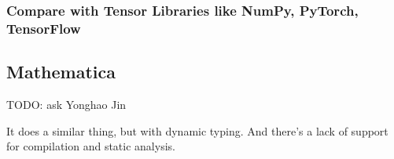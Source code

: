 \documentclass{article}
\begin{document}
\subsubsection{Compare with Tensor Libraries like NumPy, PyTorch, TensorFlow}

\subsection{Mathematica}
TODO: ask Yonghao Jin

It does a similar thing, but with dynamic typing. And there's a lack of support for compilation and static analysis.


\end{document}
